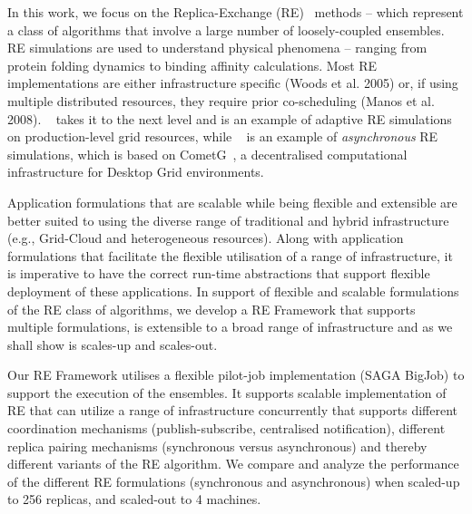 \documentclass{rspublic}
\newcommand{\jhanote}[1]{ {\textcolor{red} { ***shantenu: #1 }}}
\newcommand{\jhanote}[1]{}
\begin{document}
In this work, we focus on the Replica-Exchange
(RE)~\citep{hansmann,Sugita:1999rm} methods -- which represent a class
of algorithms that involve a large number of loosely-coupled
ensembles.  RE simulations are used to understand physical phenomena
-- ranging from protein folding dynamics to binding affinity
calculations. Most RE implementations are either infrastructure
specific (Woods et al. 2005) or, if using multiple distributed
resources, they require prior co-scheduling (Manos et
al. 2008). ~\cite{Luckow:2008fp} takes it to the next level and is an
example of adaptive RE simulations on production-level grid resources,
while ~\cite{parashar_arepex} is an example of \emph{asynchronous} RE
simulations, which is based on
CometG~\citep{Li:2005:CSC:1090948.1091381}, a decentralised
computational infrastructure for Desktop Grid environments.

Application formulations that are scalable while being flexible and
extensible are better suited to using the diverse range of traditional
and hybrid infrastructure (e.g., Grid-Cloud and heterogeneous
resources).  Along with application formulations that facilitate the
flexible utilisation of a range of infrastructure, it is imperative to
have the correct run-time abstractions that support flexible
deployment of these applications.  In support of flexible and scalable
formulations of the RE class of algorithms, we develop a RE Framework
that supports multiple formulations, is extensible to a broad range of
infrastructure and as we shall show is scales-up and scales-out.

Our RE Framework utilises a flexible pilot-job implementation (SAGA
BigJob) to support the execution of the ensembles.  It supports
scalable implementation of RE that can utilize a range of
infrastructure concurrently that supports different coordination
mechanisms (publish-subscribe, centralised notification), different
replica pairing mechanisms (synchronous versus asynchronous) and
thereby different variants of the RE algorithm.  We compare and
analyze the performance of the different RE formulations (synchronous
and asynchronous) when scaled-up to 256 replicas, and scaled-out to 4
machines. %
\end{document}
